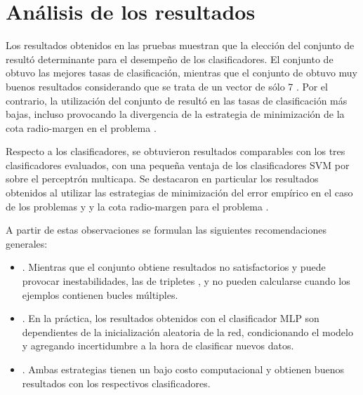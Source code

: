 %
%
%
\section{Análisis de los resultados}
%
Los resultados obtenidos en las pruebas muestran que la elección del
conjunto de  resultó determinante para el desempeño de los
clasificadores.
El conjunto de   obtuvo las mejores tasas de
clasificación, mientras que el conjunto de   obtuvo
muy buenos resultados considerando que se trata de un vector de sólo 7
.
Por el contrario, la utilización del conjunto de  
resultó en las tasas de clasificación más bajas, incluso provocando la
divergencia de la estrategia de minimización de la cota radio-margen
en el problema \prob\mipred{}.

Respecto a los clasificadores, se obtuvieron resultados comparables
con los tres clasificadores evaluados, con una pequeña ventaja de los
clasificadores SVM por sobre el perceptrón multicapa.
Se destacaron en particular los resultados obtenidos al utilizar las
estrategias de minimización del error empírico en el caso de los
problemas \prob\mipred{} y \prob\micropred{} y la cota radio-margen
para el problema \prob\tripletsvm{}.

A partir de estas observaciones se formulan las siguientes
recomendaciones generales:
%
\begin{itemize}
\item
  .
  Mientras que el conjunto  obtiene resultados no
  satisfactorios y puede provocar inestabilidades, las  de
  tripletes ,  y  no pueden calcularse
  cuando los ejemplos contienen bucles múltiples.
\item
  .
  En la práctica, los resultados obtenidos con el clasificador MLP son
  dependientes de la inicialización aleatoria de la red, condicionando
  el modelo y agregando incertidumbre a la hora de clasificar nuevos
  datos.
\item
  .
  Ambas estrategias tienen un bajo costo computacional y obtienen
  buenos resultados con los respectivos clasificadores.
\end{itemize}
%
